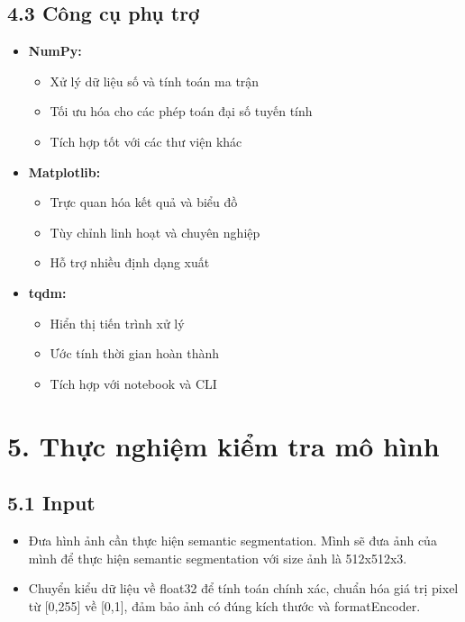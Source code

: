 \documentclass[12pt]{report}
\begin{document}
\subsection*{4.3 Công cụ phụ trợ}
\begin{itemize}
    \item \textbf{NumPy:}
        \begin{itemize}
            \item Xử lý dữ liệu số và tính toán ma trận
            \item Tối ưu hóa cho các phép toán đại số tuyến tính
            \item Tích hợp tốt với các thư viện khác
        \end{itemize}
    \item \textbf{Matplotlib:}
        \begin{itemize}
            \item Trực quan hóa kết quả và biểu đồ
            \item Tùy chỉnh linh hoạt và chuyên nghiệp
            \item Hỗ trợ nhiều định dạng xuất
        \end{itemize}
    \item \textbf{tqdm:}
        \begin{itemize}
            \item Hiển thị tiến trình xử lý
            \item Ước tính thời gian hoàn thành
            \item Tích hợp với notebook và CLI
        \end{itemize}
\end{itemize}

\section*{5. Thực nghiệm kiểm tra mô hình}

\subsection*{5.1 Input}
\begin{itemize}
    \item Đưa hình ảnh cần thực hiện semantic segmentation. Mình sẽ đưa ảnh của mình để thực hiện semantic segmentation với size ảnh là 512x512x3.
    \item Chuyển kiểu dữ liệu về float32 để tính toán chính xác, chuẩn hóa giá trị pixel từ [0,255] về [0,1], đảm bảo ảnh có đúng kích thước và formatEncoder.
\end{itemize}
\end{document}

